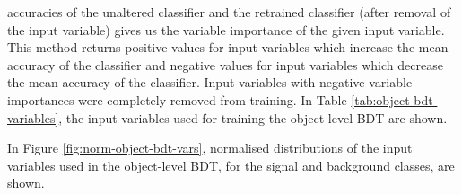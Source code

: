 accuracies of the unaltered classifier and the retrained classifier (after removal of the input variable) gives us the variable importance of the given input variable. This method returns positive values for input variables which increase the mean accuracy of the classifier and negative values for input variables which decrease the mean accuracy of the classifier. Input variables with negative variable importances were completely removed from training. In Table \ref{tab:object-bdt-variables}, the input variables used for training the object-level BDT are shown.
\begin{table}[htbp!]
\centering
\caption{A list of the input variables used in the object-level BDT, ordered by variable importance (descending, top to bottom) is shown.}

	\label{tab:object-bdt-variables}
\end{table}In Figure \ref{fig:norm-object-bdt-vars}, normalised distributions of the input variables used in the object-level BDT, for the signal and background classes, are shown. 
